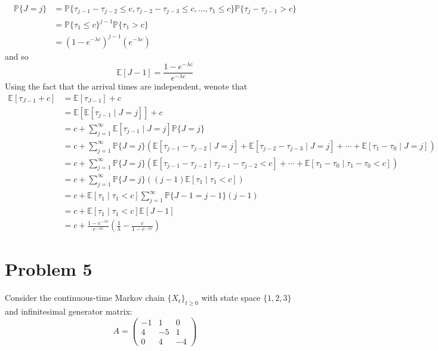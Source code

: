 \documentclass[11pt]{article}
\newcommand{\bbE}{\mathbb{E}}
\newcommand{\bbP}{\mathbb{P}}
\begin{document}
\begin{problem}
\begin{enumerate}
\begin{solution}
\begin{align*}
\bbP\{J = j\} &= \bbP\{\tau_{j-1} - \tau_{j-2} \leq  c, \tau_{j-2} - \tau_{j-3} \leq c, \dots, \tau_{1}\leq  c\} \bbP\{\tau_{j} - \tau_{j-1} >c\}\\
&= \bbP\{\tau_{1} \leq c\}^{j-1} \bbP\{\tau_{1} >c\}\\
&= (1-e^{-\lambda c})^{j-1}(e^{-\lambda c})
\end{align*}
and so 
\[\bbE[J - 1] = \frac{1- e^{-\lambda c}}{e^{-\lambda c}}\]
Using the fact that the arrival times are independent, wenote that
    \begin{align*}
        \bbE[\tau_{J-1} + c] &= \bbE[\tau_{J-1}] + c\\
        &= \bbE[\bbE[\tau_{j-1} \mid J = j]]+ c\\
        &= c + \sum_{j=1}^\infty \bbE[\tau_{j-1} \mid J = j] \bbP\{J = j\}\\
        &= c + \sum_{j=1}^\infty \bbP\{J = j\}\left( \bbE[\tau_{j-1} - \tau_{j-2} \mid J = j] + \bbE[\tau_{j-2} - \tau_{j-3} \mid J = j] + \cdots + \bbE[\tau_{1} - \tau_{0} \mid J = j]\right)\\
        &= c + \sum_{j=1}^\infty \bbP\{J = j\}\left( \bbE[\tau_{j-1} - \tau_{j-2} \mid \tau_{j-1} - \tau_{j-2} <c] + \cdots + \bbE[\tau_{1} - \tau_{0} \mid \tau_{1} - \tau_{0} <c]\right)\\
        &= c +  \sum_{j=1}^\infty \bbP\{J = j\}\left( (j-1)\bbE[\tau_{1}\mid \tau_{1}<c]\right)\\
        &= c + \bbE[\tau_{1}\mid \tau_{1}<c]\sum_{j=1}^\infty \bbP\{J-1 = j-1\} (j-1)\\
        &= c +\bbE[\tau_{1}\mid \tau_{1}<c] \bbE[J-1]\\
        &=\boxed{ c + \frac{1- e^{-\lambda c}}{e^{-\lambda c}} (\frac{1}{\lambda}- \frac{c}{1- e^{-\lambda c}})}
    \end{align*}
\end{solution}
\end{enumerate}

\end{problem}





\newpage
\section*{Problem 5}
Consider the continuous-time Markov chain \(\{X_t\}_{t \geq 0}\) with state space \(\{1, 2, 3\}\) and infinitesimal generator matrix:
\[
A = \begin{pmatrix}
-1 & 1 & 0 \\
4 & -5 & 1 \\
0 & 4 & -4
\end{pmatrix}
\]
\end{document}
